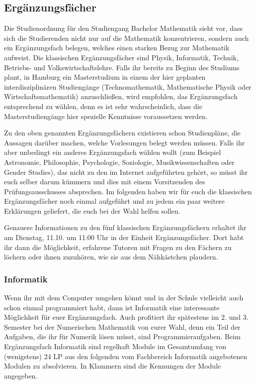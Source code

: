 
\subsection{Ergänzungsfächer}
\label{page:erg}
Die Studienordnung für den Studiengang Bachelor Mathematik sieht vor, dass sich
die Studierenden nicht nur auf die Mathematik konzentrieren, sondern auch ein
Ergänzungsfach belegen, welches einen starken Bezug zur Mathematik aufweist.
Die klassischen Ergänzungsfächer sind Physik, Informatik, Technik, Betriebs-
und Volkswirtschaftslehre. Falls ihr bereits zu Beginn des Studiums plant, in
Hamburg ein Masterstudium in einem der hier geplanten interdisziplinären
Studiengänge (Technomathematik, Mathematische Physik oder
Wirtschaftsmathematik) anzuschließen, wird empfohlen, das Ergänzungsfach
entsprechend zu wählen, denn es ist sehr wahrscheinlich, dass die
Masterstudiengänge hier spezielle Kenntnisse voraussetzen werden.

Zu den oben genannten Ergänzungsfächern existieren schon Studienpläne, die
Aussagen darüber machen, welche Vorlesungen belegt werden müssen. Falls ihr
aber unbedingt ein anderes Ergänzungsfach wählen wollt (zum Beispiel
Astronomie, Philosophie, Psychologie, Soziologie, Musikwissenschaften oder
Gender Studies), das nicht zu den im Internet aufgeführten gehört, so müsst ihr
euch selber darum kümmern und dies mit einem Vorsitzenden des
Prüfungsausschusses absprechen. Im folgenden haben wir für euch die klassischen
Ergänzungsfächer noch einmal aufgeführt und zu jedem ein paar weitere
Erklärungen geliefert, die euch bei der Wahl helfen sollen.

Genauere Informationen zu den fünf klassischen Ergänzungsfächern erhaltet ihr
am Dienstag, 11.10. um 11:00 Uhr in der Einheit Ergänzungsfächer. Dort habt ihr
dann die Möglichkeit, erfahrene Tutoren mit Fragen zu den Fächern zu löchern
oder ihnen zuzuhören, wie sie aus dem Nähkästchen plaudern.

\subsubsection{Informatik}

Wenn ihr mit dem Computer umgehen könnt und in der Schule vielleicht auch schon
einmal programmiert habt, dann ist Informatik eine interessante Möglichkeit für
euer Ergänzungsfach. Auch profitiert ihr spätestens im 2. und 3.  Semester bei
der Numerischen Mathematik von eurer Wahl, denn ein Teil der Aufgaben, die ihr
für Numerik lösen müsst, sind Programmieraufgaben. Beim Ergänzungsfach
Informatik sind regelhaft Module im Gesamtumfang von (wenigstens) 24 LP aus den
folgenden vom Fachbereich Informatik angebotenen Modulen zu absolvieren. In
Klammern sind die Kennungen der Module angegeben.

